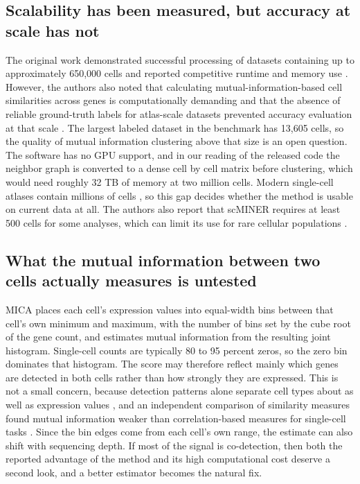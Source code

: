\subsection{Scalability has been measured, but accuracy at scale has not}
The original work demonstrated successful processing of datasets containing up to approximately 650,000 cells and reported competitive runtime and memory use \cite{pan2025scminer}. However, the authors also noted that calculating mutual-information-based cell similarities across genes is computationally demanding and that the absence of reliable ground-truth labels for atlas-scale datasets prevented accuracy evaluation at that scale \cite{pan2025scminer}. The largest labeled dataset in the benchmark has 13,605 cells, so the quality of mutual information clustering above that size is an open question. The software has no GPU support, and in our reading of the released code the neighbor graph is converted to a dense cell by cell matrix before clustering, which would need roughly 32 TB of memory at two million cells. Modern single-cell atlases contain millions of cells \cite{yao2023allen}, so this gap decides whether the method is usable on current data at all. The authors also report that scMINER requires at least 500 cells for some analyses, which can limit its use for rare cellular populations \cite{pan2025scminer}.

\subsection{What the mutual information between two cells actually measures is untested}
MICA places each cell's expression values into equal-width bins between that cell's own minimum and maximum, with the number of bins set by the cube root of the gene count, and estimates mutual information from the resulting joint histogram. Single-cell counts are typically 80 to 95 percent zeros, so the zero bin dominates that histogram. The score may therefore reflect mainly which genes are detected in both cells rather than how strongly they are expressed. This is not a small concern, because detection patterns alone separate cell types about as well as expression values \cite{qiu2020dropout}, and an independent comparison of similarity measures found mutual information weaker than correlation-based measures for single-cell tasks \cite{skinnider2019evaluating}. Since the bin edges come from each cell's own range, the estimate can also shift with sequencing depth. If most of the signal is co-detection, then both the reported advantage of the method and its high computational cost deserve a second look, and a better estimator becomes the natural fix.


